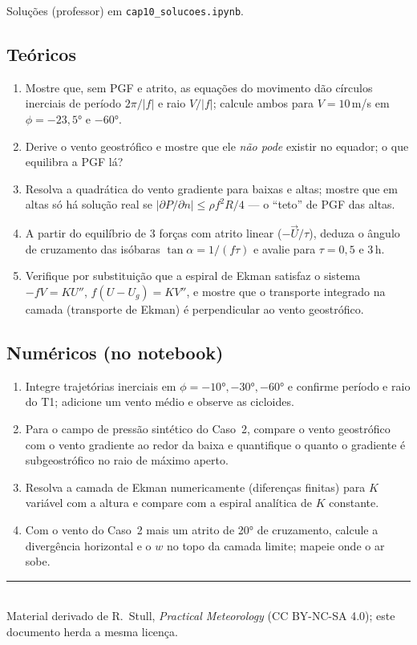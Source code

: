 \documentclass[11pt]{article}
\begin{document}
Soluções (professor) em \texttt{cap10\_solucoes.ipynb}.

\subsection*{Teóricos}

\begin{enumerate}[label=\textbf{T\arabic*.},itemsep=4pt]
  \item Mostre que, sem PGF e atrito, as equações do movimento dão
        círculos inerciais de período $2\pi/|f|$ e raio $V/|f|$; calcule
        ambos para $V = 10$\,m/s em $\phi = -23{,}5°$ e $-60°$.
  \item Derive o vento geostrófico e mostre que ele \emph{não pode}
        existir no equador; o que equilibra a PGF lá?
  \item Resolva a quadrática do vento gradiente para baixas e altas;
        mostre que em altas só há solução real se
        $|\partial P/\partial n| \le \rho f^2 R/4$ — o ``teto'' de PGF
        das altas.
  \item A partir do equilíbrio de 3 forças com atrito linear
        ($-\vec U/\tau$), deduza o ângulo de cruzamento das isóbaras
        $\tan\alpha = 1/(f\tau)$ e avalie para $\tau = 0{,}5$ e 3\,h.
  \item Verifique por substituição que a espiral de Ekman satisfaz o
        sistema $-fV = K U''$, $f(U - U_g) = K V''$, e mostre que o
        transporte integrado na camada (transporte de Ekman) é
        perpendicular ao vento geostrófico.
\end{enumerate}

\subsection*{Numéricos (no notebook)}

\begin{enumerate}[label=\textbf{N\arabic*.},itemsep=4pt]
  \item Integre trajetórias inerciais em $\phi = -10°, -30°, -60°$ e
        confirme período e raio do T1; adicione um vento médio e observe
        as cicloides.
  \item Para o campo de pressão sintético do Caso~2, compare o vento
        geostrófico com o vento gradiente ao redor da baixa e
        quantifique o quanto o gradiente é subgeostrófico no raio de
        máximo aperto.
  \item Resolva a camada de Ekman numericamente (diferenças finitas)
        para $K$ variável com a altura e compare com a espiral analítica
        de $K$ constante.
  \item Com o vento do Caso~2 mais um atrito de 20° de cruzamento,
        calcule a divergência horizontal e o $w$ no topo da camada
        limite; mapeie onde o ar sobe.
\end{enumerate}

\vspace{1em}
\noindent\rule{\linewidth}{0.4pt}\\
{\scriptsize Material derivado de R.~Stull, \emph{Practical Meteorology}
(CC BY-NC-SA 4.0); este documento herda a mesma licença.}
\end{document}
